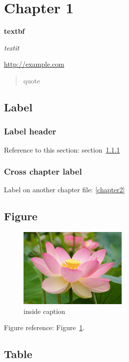 \section{Chapter 1}

\textbf{textbf}

\textit{textit}

\url{http://example.com}

\begin{quote}
  quote
\end{quote}

\subsection{Label}

  \subsubsection{Label header} \label{label-header}

    Reference to this section: section~\ref{label-header}

  \subsubsection{Cross chapter label}

    Label on another chapter file: \ref{chapter2}

\subsection{Figure}

  \begin{figure}
    \centering
    \includegraphics{images/flower.jpg}
    \caption{inside caption}
    \label{figure}
  \end{figure}

  Figure reference: Figure~\ref{figure}.

\subsection{Table}

